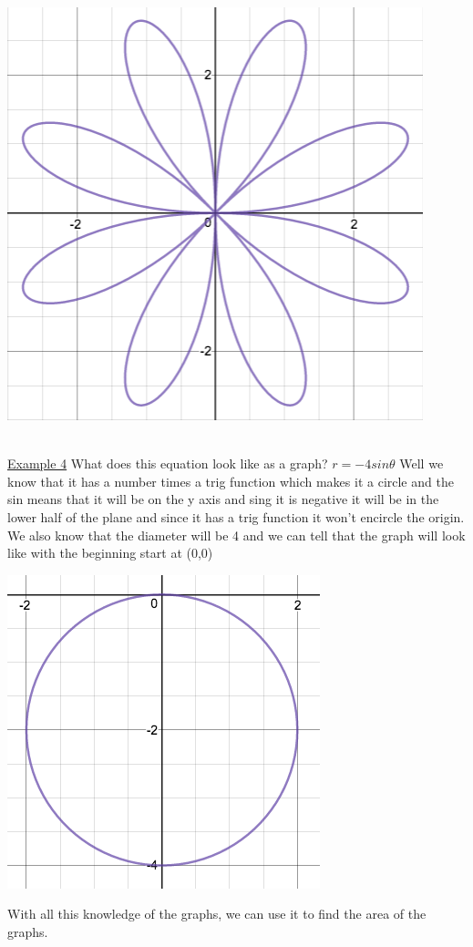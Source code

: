 \documentclass[a4paper,openright, 14pt]{article}
\begin{document}
\begin{center}
\includegraphics[width = 5 cm, height = 5 cm]{ALEX3.png}
\end{center}
\\\underline{Example 4}
What does this equation look like as a graph? $r=-4sin\theta$ Well we know that it has a number times a trig function which makes it a circle and the sin means that it will be on the y axis and sing it is negative it will be in the lower half of the plane and since it has a trig function it won't encircle the origin. We also know that the diameter will be 4 and we can tell that the graph will look like with the beginning start at (0,0)
\begin{center}
\includegraphics[width = 5 cm, height = 5 cm]{ALEX4.png}
\end{center}
With all this knowledge of the graphs, we can use it to find the area of the graphs.
\end{document}
